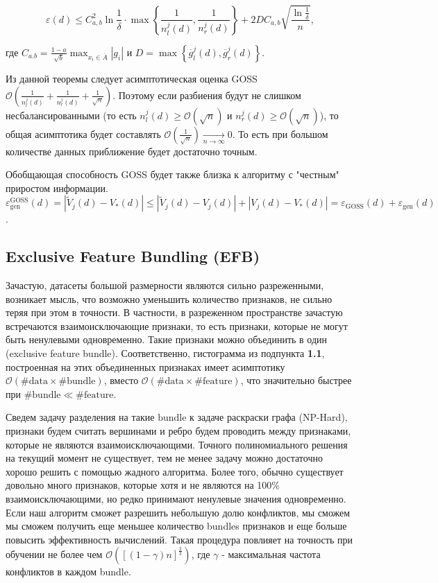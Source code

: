 \begin{equation*}
    \varepsilon(d) \leqslant C_{a, b}^2 \ln \frac{1}{\delta} \cdot \max \left\{\frac{1}{n^j_l(d)}, \frac{1}{n^j_r(d)}\right\} + 2DC_{a, b}\sqrt{\frac{\ln \frac{1}{\delta}}{n}},
\end{equation*}

где $C_{a. b} = \frac{1 - a}{\sqrt{b}}\max_{x_i \in \overline{A}}|g_i|$ и $D = \max\left\{\overline{g}_l^j(d), \overline{g}_r^j(d)\right\}$. 

Из данной теоремы следует асимптотическая оценка GOSS $\mathcal{O}\left(\frac{1}{n^j_l(d)} + \frac{1}{n^j_r(d)} + \frac{1}{\sqrt{n}}\right)$. Поэтому если разбиения будут не слишком несбалансированными (то есть $n^j_l(d) \geqslant \mathcal{O}(\sqrt{n})$ и $n^j_r(d) \geqslant \mathcal{O}(\sqrt{n})$), то общая асимптотика будет составлять $\mathcal{O}\left(\frac{1}{\sqrt{n}}\right) \underset{n\rightarrow \infty}{\rightarrow} 0$. То есть при большом количестве данных приближение будет достаточно точным.

Обобщающая способность GOSS будет также близка к алгоритму с "честным" приростом информации. $\varepsilon_{\text{gen}}^{\text{GOSS}}(d) = |\widetilde{V}_j(d) - V_*(d)| \leqslant |\widetilde{V}_j(d) - V_j(d)| + |V_j(d) - V_*(d)| = \varepsilon_{\text{GOSS}}(d) + \varepsilon_{\text{gen}}(d)$.


\subsection{Exclusive Feature Bundling (EFB)}

Зачастую, датасеты большой размерности являются сильно разреженными, возникает мысль, что возможно уменьшить количество признаков, не сильно теряя при этом в точности. В частности, в разреженном пространстве зачастую встречаются взаимоисключающие признаки, то есть признаки, которые не могут быть ненулевыми одновременно. Такие признаки можно объединить в один (exclusive feature bundle). Соответственно, гистограмма из подпункта \textbf{1.1}, построенная на этих объединенных признаках имеет асимптотику $\mathcal{O}(\#\text{data}\times\#\text{bundle})$, вместо $\mathcal{O}(\#\text{data}\times\#\text{feature})$, что значительно быстрее при $\text{\#bundle} \ll \#\text{feature}$.

Сведем задачу разделения на такие $\text{bundle}$ к задаче раскраски графа (NP-Hard), признаки будем считать вершинами и ребро будем проводить между признаками, которые не являются взаимоисключающими. Точного полиномиального решения на текущий момент не существует, тем не менее задачу можно достаточно хорошо решить с помощью жадного алгоритма. Более того, обычно существует довольно много признаков, которые хотя и не являются на 100\% взаимоисключающими, но редко принимают ненулевые значения одновременно. Если наш алгоритм сможет разрешить небольшую долю конфликтов, мы сможем мы сможем получить еще меньшее количество bundles признаков и еще больше повысить эффективность вычислений. Такая процедура повлияет на точность при обучении не более чем $\mathcal{O}\left([(1-\gamma)n]^{\frac{2}{3}}\right)$, где $\gamma$ - максимальная частота конфликтов в каждом bundle.

